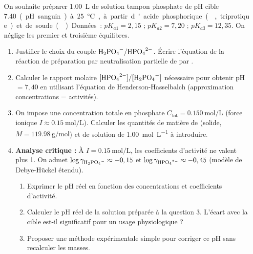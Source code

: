 \documentclass[11pt]{article}
\begin{document}
\begin{exercice}
On souhaite préparer \SI{1,00}{\liter} de solution tampon phosphate de pH cible \SI{7,40} (pH sanguin) à \SI{25}{\celsius}, à partir d'acide phosphorique (, triprotique) et de soude (). Données : $pK_{a1}=2,15$ ; $pK_{a2}=7,20$ ; $pK_{a3}=12,35$. On néglige les premier et troisième équilibres.
\begin{enumerate}
    \item Justifier le choix du couple $\ce{H2PO4-}/\ce{HPO4^{2-}}$. Écrire l'équation de la réaction de préparation par neutralisation partielle de  par .
    \item Calculer le rapport molaire $[\ce{HPO4^{2-}}]/[\ce{H2PO4-}]$ nécessaire pour obtenir pH $= 7,40$ en utilisant l'équation de Henderson-Hasselbalch (approximation concentrations = activités).
    \item On impose une concentration totale en phosphate $C_{\text{tot}} = \SI{0,150}{\mol\per\liter}$ (force ionique $I \approx \SI{0,15}{\mol\per\liter}$). Calculer les quantités de matière de  (solide, $M=\SI{119,98}{\gram\per\mol}$) et de solution de  \SI{1,00}{\mol\per\liter} à introduire.
    \item \textbf{Analyse critique :} À $I = \SI{0,15}{\mol\per\liter}$, les coefficients d'activité ne valent plus 1. On admet $\log \gamma_{\ce{H2PO4-}} \approx -0,15$ et $\log \gamma_{\ce{HPO4^{2-}}} \approx -0,45$ (modèle de Debye-Hückel étendu). 
    \begin{enumerate}
        \item Exprimer le pH réel en fonction des concentrations et coefficients d'activité.
        \item Calculer le pH réel de la solution préparée à la question 3. L'écart avec la cible est-il significatif pour un usage physiologique ?
        \item Proposer une méthode expérimentale simple pour corriger ce pH sans recalculer les masses.
    \end{enumerate}
\end{enumerate}
\end{exercice}
\end{document}
